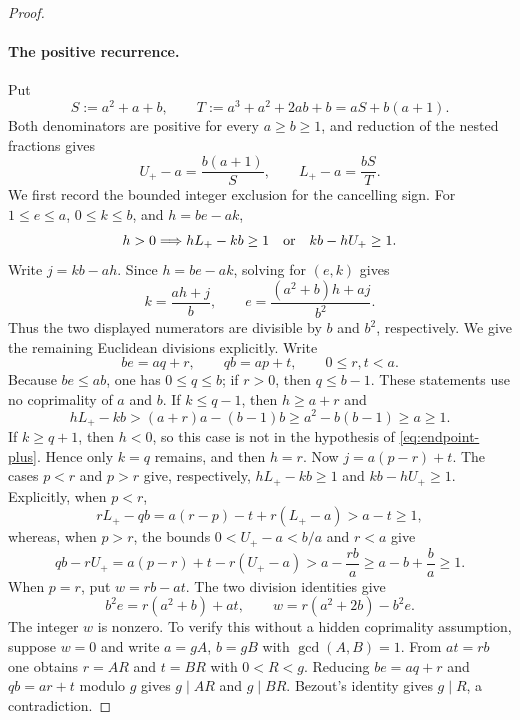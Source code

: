 \begin{proof}
\paragraph{The positive recurrence.}
Put
\[
S:=a^2+a+b,
\qquad
T:=a^3+a^2+2ab+b=aS+b(a+1).
\]
Both denominators are positive for every $a\ge b\ge1$, and reduction of the
nested fractions gives
\begin{equation}
U_+-a=\frac{b(a+1)}S,
\qquad
L_+-a=\frac{bS}T.
\label{eq:positive-offsets}
\end{equation}
We first record the bounded integer exclusion for the cancelling sign.  For
$1\le e\le a$, $0\le k\le b$, and $h=be-ak$,
\begin{equation}
h>0\Longrightarrow
  hL_+-kb\ge1\quad\hbox{or}\quad kb-hU_+\ge1.
\label{eq:endpoint-plus}
\end{equation}
Write $j=kb-ah$.  Since $h=be-ak$, solving for $(e,k)$ gives
\[
k=\frac{ah+j}{b},\qquad
e=\frac{(a^2+b)h+aj}{b^2}.
\]
Thus the two displayed numerators are divisible by $b$ and $b^2$,
respectively.  We give the remaining Euclidean divisions explicitly.  Write
\[
be=aq+r,\qquad qb=ap+t,\qquad 0\le r,t<a.
\]
Because $be\le ab$, one has $0\le q\le b$; if $r>0$, then $q\le b-1$.
These statements use no coprimality of $a$ and $b$.
If $k\le q-1$, then $h\ge a+r$ and
\[
hL_+-kb>(a+r)a-(b-1)b
\ge a^2-b(b-1)\ge a\ge1.
\]
If $k\ge q+1$, then $h<0$, so this case is not in the hypothesis of
\eqref{eq:endpoint-plus}.  Hence only $k=q$ remains, and then $h=r$.
Now $j=a(p-r)+t$.  The cases $p<r$ and $p>r$ give, respectively,
$hL_+-kb\ge1$ and $kb-hU_+\ge1$.  Explicitly, when $p<r$,
\[
rL_+-qb=a(r-p)-t+r(L_+-a)>a-t\ge1,
\]
whereas, when $p>r$, the bounds $0<U_+-a<b/a$ and $r<a$ give
\[
qb-rU_+=a(p-r)+t-r(U_+-a)
>a-\frac{rb}{a}\ge a-b+\frac ba\ge1.
\]
When $p=r$, put $w=rb-at$.  The two division identities give
\begin{equation}
b^2e=r(a^2+b)+at,\qquad w=r(a^2+2b)-b^2e.
\label{eq:plus-terminal-divisions}
\end{equation}
The integer $w$ is nonzero.  To verify this without a hidden coprimality
assumption, suppose $w=0$ and write $a=gA$, $b=gB$ with
$\gcd(A,B)=1$.  From $at=rb$ one obtains $r=AR$ and $t=BR$ with
$0<R<g$.  Reducing $be=aq+r$ and $qb=ar+t$ modulo $g$ gives
$g\mid AR$ and $g\mid BR$.  Bezout's identity gives $g\mid R$, a
contradiction.


\end{proof}
